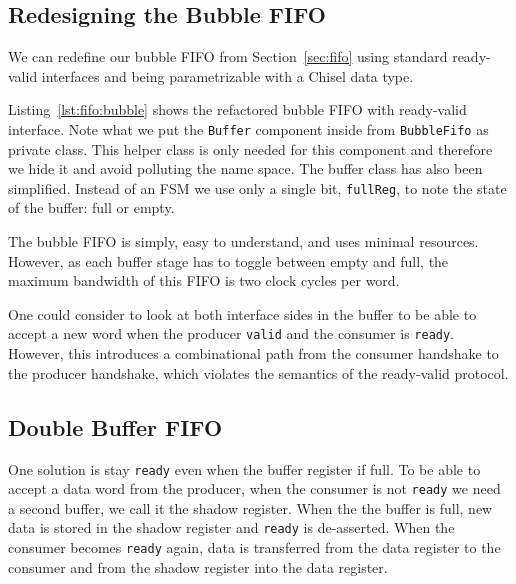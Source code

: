 \documentclass[%
    10pt,
    headinclude, footexclude,
    openright, %
    notitlepage,
    cleardoubleempty,
    headsepline,
    pointlessnumbers,
    bibtotoc, idxtotoc,
    ]{scrbook}
\newcommand{\code}[1]{{\small{\texttt{#1}}}}
\begin{document}
\subsection{Redesigning the Bubble FIFO}

We can redefine our bubble FIFO from Section~\ref{sec:fifo} using standard
ready-valid interfaces and being parametrizable with a Chisel data type.


Listing~\ref{lst:fifo:bubble} shows the refactored bubble FIFO with ready-valid
interface. Note what we put the \code{Buffer} component inside from \code{BubbleFifo}
as private class. This helper class is only needed for this component and therefore
we hide it and avoid polluting the name space. The buffer class has also been
simplified. Instead of an FSM we use only a single bit, \code{fullReg}, to note
the state of the buffer: full or empty.

The bubble FIFO is simply, easy to understand, and uses minimal resources.
However, as each buffer stage has to toggle between empty and full, the maximum
bandwidth of this FIFO is two clock cycles per word.

One could consider to look at both interface sides in the buffer to be able to accept
a new word when the producer \code{valid} and the consumer is \code{ready}.
However, this introduces a combinational path from the consumer handshake
to the producer handshake, which violates the semantics of the ready-valid protocol.

\subsection{Double Buffer FIFO}


One solution is stay \code{ready} even when the buffer register if full.
To be able to accept a data word from the producer, when the consumer is not
\code{ready} we need a second buffer, we call it the shadow register.
When the the buffer is full, new data is stored in the shadow register and \code{ready}
is de-asserted. When the consumer becomes \code{ready} again, data is transferred
from the data register to the consumer and from the shadow register into
the data register.

\end{document}
